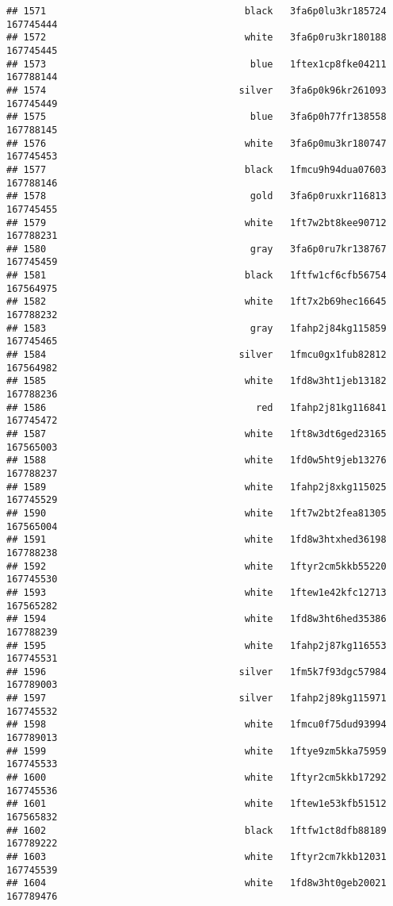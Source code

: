 \documentclass[
]{article}
\begin{document}
\begin{verbatim}
## 1571                                   black   3fa6p0lu3kr185724 167745444
## 1572                                   white   3fa6p0ru3kr180188 167745445
## 1573                                    blue   1ftex1cp8fke04211 167788144
## 1574                                  silver   3fa6p0k96kr261093 167745449
## 1575                                    blue   3fa6p0h77fr138558 167788145
## 1576                                   white   3fa6p0mu3kr180747 167745453
## 1577                                   black   1fmcu9h94dua07603 167788146
## 1578                                    gold   3fa6p0ruxkr116813 167745455
## 1579                                   white   1ft7w2bt8kee90712 167788231
## 1580                                    gray   3fa6p0ru7kr138767 167745459
## 1581                                   black   1ftfw1cf6cfb56754 167564975
## 1582                                   white   1ft7x2b69hec16645 167788232
## 1583                                    gray   1fahp2j84kg115859 167745465
## 1584                                  silver   1fmcu0gx1fub82812 167564982
## 1585                                   white   1fd8w3ht1jeb13182 167788236
## 1586                                     red   1fahp2j81kg116841 167745472
## 1587                                   white   1ft8w3dt6ged23165 167565003
## 1588                                   white   1fd0w5ht9jeb13276 167788237
## 1589                                   white   1fahp2j8xkg115025 167745529
## 1590                                   white   1ft7w2bt2fea81305 167565004
## 1591                                   white   1fd8w3htxhed36198 167788238
## 1592                                   white   1ftyr2cm5kkb55220 167745530
## 1593                                   white   1ftew1e42kfc12713 167565282
## 1594                                   white   1fd8w3ht6hed35386 167788239
## 1595                                   white   1fahp2j87kg116553 167745531
## 1596                                  silver   1fm5k7f93dgc57984 167789003
## 1597                                  silver   1fahp2j89kg115971 167745532
## 1598                                   white   1fmcu0f75dud93994 167789013
## 1599                                   white   1ftye9zm5kka75959 167745533
## 1600                                   white   1ftyr2cm5kkb17292 167745536
## 1601                                   white   1ftew1e53kfb51512 167565832
## 1602                                   black   1ftfw1ct8dfb88189 167789222
## 1603                                   white   1ftyr2cm7kkb12031 167745539
## 1604                                   white   1fd8w3ht0geb20021 167789476

\end{verbatim}
\end{document}
